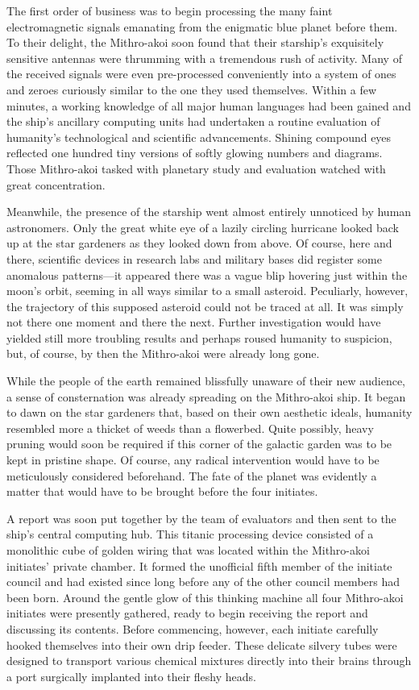 \documentclass[14pt]{extarticle}
\begin{document}
The first order of business was to begin processing the many faint electromagnetic signals emanating from the enigmatic blue planet before them.
To their delight, the Mithro-akoi soon found that their starship's exquisitely sensitive antennas were thrumming with a tremendous rush of activity.
Many of the received signals were even pre-processed conveniently into a system of ones and zeroes curiously similar to the one they used themselves.
Within a few minutes, a working knowledge of all major human languages had been gained and the ship's ancillary computing units had undertaken a routine evaluation of humanity's technological and scientific advancements.
Shining compound eyes reflected one hundred tiny versions of softly glowing numbers and diagrams. 
Those Mithro-akoi tasked with planetary study and evaluation watched with great concentration.

Meanwhile, the presence of the starship went almost entirely unnoticed by human astronomers.
Only the great white eye of a lazily circling hurricane looked back up at the star gardeners as they looked down from above.
Of course, here and there, scientific devices in research labs and military bases did register some anomalous patterns---it appeared there was a vague blip hovering just within the moon's orbit, 
seeming in all ways similar to a small asteroid. 
Peculiarly, however, the trajectory of this supposed asteroid could not be traced at all.
It was simply not there one moment and there the next.
Further investigation would have yielded still more troubling results
and perhaps roused humanity to suspicion, 
but, of course, by then the Mithro-akoi were already long gone.

While the people of the earth remained blissfully unaware of their new audience,
a sense of consternation was already spreading on the Mithro-akoi ship.
It began to dawn on the star gardeners that,
based on their own aesthetic ideals,
humanity resembled more a thicket of weeds than a flowerbed.
Quite possibly, heavy pruning would soon be required if this corner of the galactic garden was to be kept in pristine shape.
Of course, any radical intervention would have to be meticulously considered beforehand.
The fate of the planet was evidently a matter that would have to be brought before the four initiates.

A report was soon put together by the team of evaluators and then sent to the ship's central computing hub.
This titanic processing device consisted of a monolithic cube of golden wiring that was located within the Mithro-akoi initiates' private chamber.
It formed the unofficial fifth member of the initiate council and had existed since long before any of the other council members had been born.
Around the gentle glow of this thinking machine all four Mithro-akoi initiates were presently gathered, ready to begin receiving the report and discussing its contents.
Before commencing, however, each initiate carefully hooked themselves into their own drip feeder.
These delicate silvery tubes were designed to transport various chemical mixtures directly into their brains through a port surgically implanted into their fleshy heads.
\end{document}
